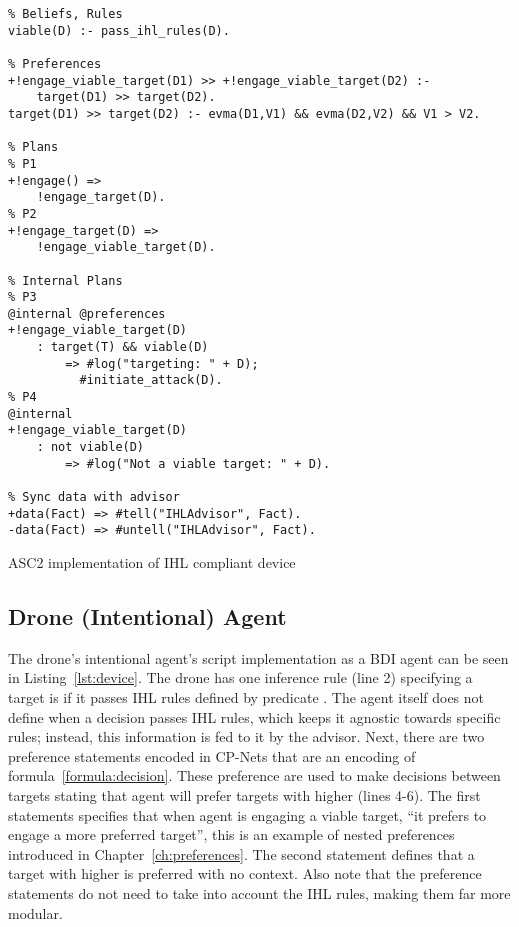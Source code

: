 

\begin{listing}
\centering
\begin{verbatim}
% Beliefs, Rules
viable(D) :- pass_ihl_rules(D).

% Preferences
+!engage_viable_target(D1) >> +!engage_viable_target(D2) :-
    target(D1) >> target(D2).
target(D1) >> target(D2) :- evma(D1,V1) && evma(D2,V2) && V1 > V2.

% Plans
% P1
+!engage() =>
    !engage_target(D).
% P2
+!engage_target(D) =>
    !engage_viable_target(D).

% Internal Plans
% P3
@internal @preferences
+!engage_viable_target(D)
    : target(T) && viable(D)
        => #log("targeting: " + D);
          #initiate_attack(D).
% P4
@internal
+!engage_viable_target(D)
    : not viable(D)
        => #log("Not a viable target: " + D).

% Sync data with advisor
+data(Fact) => #tell("IHLAdvisor", Fact).
-data(Fact) => #untell("IHLAdvisor", Fact).
\end{verbatim}
\caption{ASC2 implementation of IHL compliant device}
\label{lst:device}
\end{listing}


\subsection{Drone (Intentional) Agent}
The drone's intentional agent's script implementation as a BDI agent can be seen in Listing~\ref{lst:device}. The drone has one inference rule (line 2) specifying a target is  if it passes IHL rules defined by predicate . The agent itself does not define when a decision passes IHL rules, which keeps it agnostic towards specific rules; instead, this information is fed to it by the advisor. Next, there are two preference statements encoded in CP-Nets that are an encoding of formula~\ref{formula:decision}. These preference are used to make decisions between targets stating that agent will prefer targets with higher  (lines 4-6). The first statements specifies that when agent is engaging a viable target, ``it prefers to engage a more preferred target'', this is an example of nested preferences introduced in Chapter~\ref{ch:preferences}. The second statement defines that a target with higher  is preferred with no context. Also note that the preference statements do not need to take into account the IHL rules, making them far more modular. 

